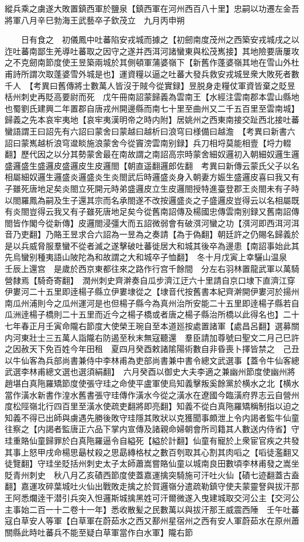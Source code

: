 縱兵乘之虜遂大敗置鎮西軍於鹽泉【鎮西軍在河州西百八十里】忠嗣以功遷左金吾將軍八月辛巳勃海王武藝卒子欽茂立　九月丙申朔

　　日有食之　初儀鳳中吐蕃陷安戎城而據之【初劒南度茂州之西築安戎城戌之以迮吐蕃南鄙生羌導吐蕃取之因守之遂并西洱河諸蠻東與松茂嶲接】其地險要唐屢攻之不克劒南節度使王昱築兩城於其側頓軍蒲婆嶺下【新舊作蓬婆嶺其地在雪山外杜甫詩所謂次取蓬婆雪外城是也】運資糧以逼之吐蕃大發兵救安戎城昱衆大敗死者數千人　【考異曰舊傳將士數萬人皆沒于賊今從實録】昱脱身走糧仗軍資皆棄之貶昱栝州刺史再貶高要尉而死　戊午冊南詔蒙歸義為雲南王【水經注雲南郡本雲山縣地也蜀劉氏建興二年置郡自唐戎州開邊縣而南七十里至曲州又二千五百里至雲南城】歸義之先本哀牢夷地【哀牢夷漢明帝之時内附】居姚州之西東南接交趾西北接吐蕃蠻語謂王曰詔先有六詔曰蒙舍曰蒙越曰越析曰浪穹曰様備曰越澹　【考異曰新書六詔曰蒙嶲越析浪穹邆睒施浪蒙舍今從竇滂雲南别録】兵刀相埒莫能相壹【埒力輟翻】歷代因之以分其勢蒙舍最在南故謂之南詔高宗時蒙舍細奴邏初入朝細奴邏生邏盛邏盛生盛邏皮盛邏皮生皮邏閤【朝直遥翻邏郎佐翻　考異曰新傳云蒙氏父子以名相屬細奴邏生邏盛炎邏盛炎生炎閤武后時邏盛炎身入朝妻方娠生盛邏皮喜曰我又有子雖死唐地足矣炎閤立死開元時弟盛邏皮立生皮邏閤授特進臺登郡王炎閤未有子時以閤羅鳳為嗣及生子還其宗而名承閤遂不改按邏盛炎之子盛邏皮豈得云以名相屬既有炎閤豈得云我又有子雖死唐地足矣今從舊南詔傳及楊國忠傳雲南别録又舊南詔傳閤皆作閣今從新傳】皮邏閤浸彊大而五詔微弱會有破渳河蠻之功【渳河即西洱河洱音乃吏翻】乃賂王昱求合六詔為一昱為之奏請【為于偽翻】朝廷許之仍賜名歸義於是以兵威脅服羣蠻不從者滅之遂擊破吐蕃徙居大和城其後卒為邊患【南詔事始此其先烏蠻别種夷語山陂陀為和故謂之大和城卒子恤翻】　冬十月戊寅上幸驪山温泉　壬辰上還宫　是歲於西京東都往來之路作行宫千餘間　分左右羽林置龍武軍以萬騎營隸焉【騎奇寄翻】　潤州刺史齊澣奏自瓜步濟江迂六十里請自京口埭下直濟江穿伊婁河二十五里即逹楊子縣立伊婁埭從之【埭音代按舊書本紀齊澣開伊婁河於揚州南瓜州浦則今之瓜州運河是也但楊子縣今為真州治所安能二十五里即逹楊子縣若自瓜洲逹楊子橋則二十五里而近今之楊子橋或者唐之楊子縣治所橋以此得名也】二十七年春正月壬寅命隴右節度大使榮王琬自至本道廵按處置諸軍【處昌呂翻】選募關内河東壯士三五萬人詣隴右防遏至秋末無寇聽還　羣臣請加尊號曰聖文二月己巳許之因赦天下免百姓今年田租　夏四月癸酉敕諸隂陽術數自非昏喪卜擇皆禁之　己丑以牛仙客為兵部尚書兼侍中李林甫為吏部尚書兼中書令總文武選事【蓋令牛仙客總武選李林甫總文選也選須絹翻】　六月癸酉以御史大夫李適之兼幽州節度使幽州將趙堪白真陁羅矯節度使張守珪之命使平盧軍使烏知義擊叛奚餘黨於横水之北【横水當作潢水新書作湟水舊書張守珪傳作潢水今從之潢水在遼國今臨潢府界志云自營州度松陘嶺北行四百里至潢水使疏吏翻將即亮翻】知義不從白真陁羅矯稱制指以迫之知義不得已出師與虜遇先勝後敗守珪隱其敗狀以克獲聞事頗泄上令内謁者監牛仙童往察之【内謁者監唐正六品下掌内宣傳及諸親命婦朝會所司籍其人數送内侍省】守珪重賂仙童歸罪於白真陁羅逼令自縊死【縊於計翻】仙童有寵於上衆宦官疾之共發其事上怒甲戌命楊思朂杖殺之思勗縳格杖之數百刳取其心割其肉㗖之【㗖徒濫翻又徒覽翻】守珪坐貶括州刺史太子太師蕭嵩嘗賂仙童以城南良田數頃李林甫發之嵩坐貶青州刺史　秋八月乙亥磧西節度使蓋嘉運擒突騎施可汗吐火仙【磧七迹翻蓋古盍翻】嘉運攻碎葉城吐火仙出戰敗走擒之於賀邏嶺分遣疏勒鎮守使夫蒙靈詧與拔汗那王阿悉爛逹干潜引兵突入怛邏斯城擒黑姓可汗爾微遂入曳建城取交河公主【交河公主事始二百一十二卷十一年】悉收散髪之民數萬以與拔汗那王威震西陲　壬午吐蕃寇白草安人等軍【白草軍在蔚茹水之西又鄯州星宿州之西有安人軍蔚茹水在原州蕭關縣此時吐蕃兵不能至疑白草軍當作白水軍】隴右節